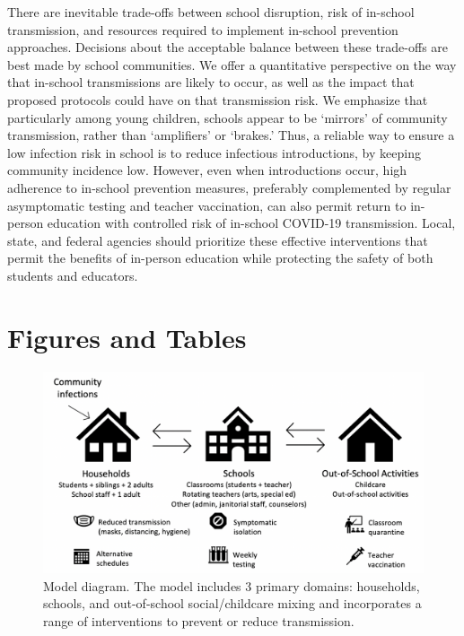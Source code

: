 \documentclass[
]{article}
\begin{document}
There are inevitable trade-offs between school disruption, risk of
in-school transmission, and resources required to implement in-school
prevention approaches. Decisions about the acceptable balance between
these trade-offs are best made by school communities. We offer a
quantitative perspective on the way that in-school transmissions are
likely to occur, as well as the impact that proposed protocols could
have on that transmission risk. We emphasize that particularly among
young children, schools appear to be `mirrors' of community
transmission, rather than `amplifiers' or `brakes.' Thus, a reliable way
to ensure a low infection risk in school is to reduce infectious
introductions, by keeping community incidence low. However, even when
introductions occur, high adherence to in-school prevention measures,
preferably complemented by regular asymptomatic testing and teacher
vaccination, can also permit return to in-person education with
controlled risk of in-school COVID-19 transmission. Local, state, and
federal agencies should prioritize these effective interventions that
permit the benefits of in-person education while protecting the safety
of both students and educators.

\clearpage

\hypertarget{figures-and-tables}{%
\section{Figures and Tables}\label{figures-and-tables}}

\begin{figure}
\centering
\includegraphics[width=150mm]{model2.png}
\caption{\label{fig1}Model diagram.  The model includes 3 primary domains: households, schools, and out-of-school social/childcare mixing and incorporates a range of interventions to prevent or reduce transmission.}
\end{figure}
\end{document}
